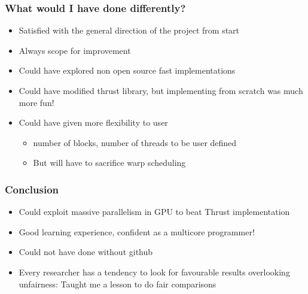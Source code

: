 \documentclass[mathserif]{beamer}
\begin{document}
\begin{frame}                                                                                                                                                                          
\frametitle{What would I have done differently?}
\begin{center}
\begin{itemize}
\item Satisfied with the general direction of the project from start
\item Always scope for improvement
\item Could have explored non open source fast implementations 
\item Could have modified thrust library, but implementing from scratch was much more fun!
\item Could have given more flexibility to user 
\begin{itemize}
\item number of blocks, number of threads to be user defined         
\item But will have to sacrifice warp scheduling  
\end{itemize}
\end{itemize}
\end{center}
\end{frame}             

\begin{frame}                                                                                                                                                                          
\frametitle{Conclusion}
\begin{center}
\begin{itemize}
\item Could exploit massive parallelism in GPU to beat Thrust implementation 
\item Good learning experience, confident as a multicore programmer!
\item Could not have done without github
\item Every researcher has a tendency to look for favourable results overlooking unfairness: Taught me a lesson to do fair comparisons 
\end{itemize}
\end{center}
\end{frame}             
\end{document}
